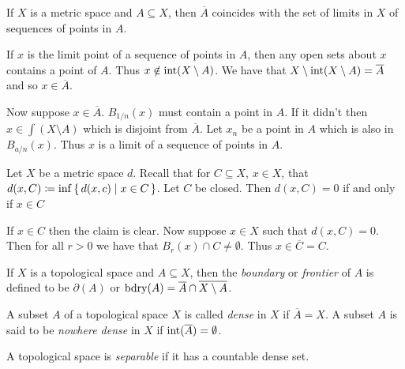 \documentclass[letterpaper, 11pt]{article}
\begin{document}
\begin{prop}
  If $X$ is a metric space and $A \subseteq X$, then $\overline{A}$ coincides with the set of limits in $X$ of sequences of points in $A$.
\end{prop}
\begin{pf}
  If $x$ is the limit point of a sequence of points in $A$, then any open sets about $x$ contains a point of $A$.
  Thus $x \notin \operatorname{int}(X \setminus A)$.
  We have that $X \setminus \operatorname{int}(X \setminus A) = \overline{A}$ and so $x \in \overline{A}$.

  Now suppose $x \in \overline{A}$.
  $B_{1 / n}(x)$ must contain a point in $A$.
  If it didn't then $x \in \int(X \setminus A)$ which is disjoint from $\overline{A}$.
  Let $x_{n}$ be a point in $A$ which is also in $B_{a / n}(x)$.
  Thus $x$ is a limit of a sequence of points in $A$.
\end{pf}

\begin{prop}\label{prop: closed_dist_inf_0}
  Let $X$ be a metric space $d$.
  Recall that for $C \subseteq X$, $x \in X$, that $d(x, C) \coloneqq \inf\set{d(x, c) | x \in C}$.
  Let $C$ be closed.
  Then $d(x, C) = 0$ if and only if $x \in C$
\end{prop}
\begin{pf}
  If $x \in C$ then the claim is clear.
  Now suppose $x \in X$ such that $d(x, C) = 0$.
  Then for all $r > 0$ we have that $B_{r}(x) \cap C \neq \emptyset$.
  Thus $x \in \overline{C} = C$.
\end{pf}

\begin{defn}[Boundary]
  If $X$ is a topological space and $A \subseteq X$, then the \emph{boundary} or \emph{frontier} of $A$ is defined to be $\partial(A)$ or $\operatorname{bdry}(A) = \overline{A} \cap \overline{X \setminus A}$.
\end{defn}

\begin{defn}
  A subset $A$ of a topological space $X$ is called \emph{dense} in $X$ if $\overline{A} = X$.
  A subset $A$ is said to be \emph{nowhere dense} in $X$ if $\operatorname{int}(\overline{A}) = \emptyset$.
\end{defn}

\begin{defn}
  A topological space is \emph{separable} if it has a countable dense set.
\end{defn}
\end{document}
